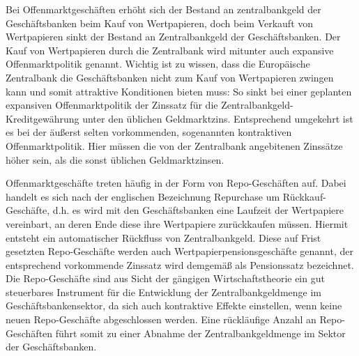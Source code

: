 \documentclass[
      onecolumn,
      a4paper,
      abstracton,
      parskip=half
      ,final
      ]{scrartcl}
\begin{document}
Bei Offenmarktgesch{\"a}ften erh{\"o}ht sich der Bestand an zentralbankgeld der Gesch{\"a}ftsbanken beim Kauf von Wertpapieren, doch beim Verkauft von Wertpapieren sinkt der Bestand an Zentralbankgeld der Gesch{\"a}ftsbanken. Der Kauf von Wertpapieren durch die Zentralbank wird mitunter auch expansive Offenmarktpolitik genannt.
Wichtig ist zu wissen, dass die Europ{\"a}ische Zentralbank die Gesch{\"a}ftsbanken nicht zum Kauf von Wertpapieren zwingen kann und somit attraktive Konditionen bieten muss: So sinkt bei einer geplanten expansiven Offenmarktpolitik der Zinssatz f{\"u}r die Zentralbankgeld-Kreditgew{\"a}hrung unter den {\"u}blichen Geldmarktzins. Entsprechend umgekehrt ist es bei der {\"a}ußerst selten vorkommenden, sogenannten kontraktiven Offenmarktpolitik. Hier m{\"u}ssen die von der Zentralbank angebitenen Zinss{\"a}tze h{\"o}her sein, als die sonst {\"u}blichen Geldmarktzinsen.

Offenmarktgesch{\"a}fte treten h{\"a}ufig in der Form von Repo-Gesch{\"a}ften auf. Dabei handelt es sich nach der englischen Bezeichnung Repurchase um R{\"u}ckkauf-Gesch{\"a}fte, d.h. es wird mit den Gesch{\"a}ftsbanken eine Laufzeit der Wertpapiere vereinbart, an deren Ende diese ihre Wertpapiere zur{\"u}ckkaufen m{\"u}ssen. Hiermit entsteht ein automatischer R{\"u}ckfluss von Zentralbankgeld. Diese auf Frist gesetzten Repo-Gesch{\"a}fte werden auch Wertpapierpensionsgesch{\"a}fte genannt, der entsprechend vorkommende Zinssatz wird demgem{\"a}ß als Pensionssatz bezeichnet.
Die Repo-Gesch{\"a}fte sind aus Sicht der g{\"a}ngigen Wirtschaftstheorie ein gut steuerbares Instrument f{\"u}r die Entwicklung der Zentralbankgeldmenge im Gesch{\"a}ftsbankensektor, da sich auch kontraktive Effekte einstellen, wenn keine neuen Repo-Gesch{\"a}fte abgeschlossen werden. Eine r{\"u}ckl{\"a}ufige Anzahl an Repo-Gesch{\"a}ften f{\"u}hrt somit zu einer Abnahme der Zentralbankgeldmenge im Sektor der Gesch{\"a}ftsbanken.
\end{document}
